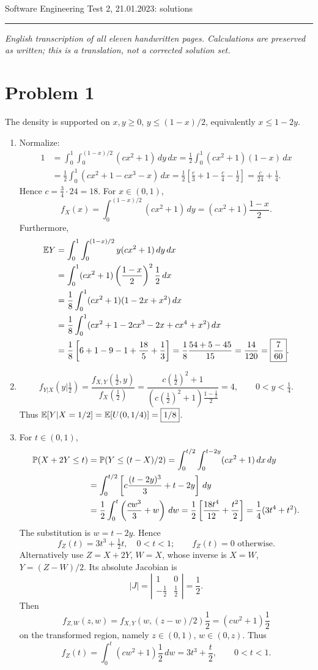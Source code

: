 \documentclass[a4paper]{article}
\begin{document}
\noindent Software Engineering \hfill Test 2, 21.01.2023: solutions
\par\smallskip\hrule\smallskip\noindent
\textit{English transcription of all eleven handwritten pages. Calculations are preserved as written; this is a translation, not a corrected solution set.}

\section*{Problem 1}
The density is supported on $x,y\geq0$, $y\leq(1-x)/2$, equivalently $x\leq1-2y$.
\begin{enumerate}
\item Normalize:
\begin{align*}
1&=\int_0^1\int_0^{(1-x)/2}(cx^2+1)\,dy\,dx
=\frac12\int_0^1(cx^2+1)(1-x)\,dx\\
&=\frac12\int_0^1(cx^2+1-cx^3-x)\,dx
=\frac12\left[\frac c3+1-\frac c4-\frac12\right]
=\frac c{24}+\frac14.
\end{align*}
Hence $\boxed{c=\frac34\cdot24=18}$.
For $x\in(0,1)$,
\[
\boxed{f_X(x)=\int_0^{(1-x)/2}(cx^2+1)\,dy
=(cx^2+1)\frac{1-x}{2}.}
\]
Furthermore,
\begin{align*}
\E Y&=\int_0^1\int_0^{(1-x)/2}y(cx^2+1)\,dy\,dx\\
&=\int_0^1(cx^2+1)\left(\frac{1-x}{2}\right)^2\frac12\,dx\\
&=\frac18\int_0^1(cx^2+1)(1-2x+x^2)\,dx\\
&=\frac18\int_0^1(cx^2+1-2cx^3-2x+cx^4+x^2)\,dx\\
&=\frac18\left[6+1-9-1+\frac{18}{5}+\frac13\right]
=\frac18\frac{54+5-45}{15}=\frac{14}{120}=\boxed{\frac7{60}}.
\end{align*}
\item
\[
f_{Y|X}(y|\tfrac12)=
\frac{f_{X,Y}(\frac12,y)}{f_X(\frac12)}
=\frac{c(\frac12)^2+1}{(c(\frac12)^2+1)\frac{1-\frac12}{2}}
=4,\qquad 0<y<\tfrac14.
\]
Thus $\E[Y|X=1/2]=\E[U(0,1/4)]=\boxed{1/8}$.
\item For $t\in(0,1)$,
\begin{align*}
\P(X+2Y\leq t)&=\P(Y\leq(t-X)/2)
=\int_0^{t/2}\int_0^{t-2y}(cx^2+1)\,dx\,dy\\
&=\int_0^{t/2}\left[c\frac{(t-2y)^3}{3}+t-2y\right]\,dy\\
&=\frac12\int_0^t\left(\frac{cw^3}{3}+w\right)\,dw
=\frac12\left[\frac{18t^4}{12}+\frac{t^2}{2}\right]
=\frac14(3t^4+t^2).
\end{align*}
The substitution is $w=t-2y$. Hence
\[
\boxed{f_Z(t)=3t^3+\tfrac12t,\quad0<t<1;\qquad f_Z(t)=0\text{ otherwise}.}
\]
Alternatively use $Z=X+2Y$, $W=X$, whose inverse is $X=W$, $Y=(Z-W)/2$. Its absolute Jacobian is
\[
|J|=\left|\begin{matrix}1&0\\-\frac12&\frac12\end{matrix}\right|=\frac12.
\]
Then
\[
f_{Z,W}(z,w)=f_{X,Y}(w,(z-w)/2)\frac12=(cw^2+1)\frac12
\]
on the transformed region, namely $z\in(0,1)$, $w\in(0,z)$. Thus
\[
f_Z(t)=\int_0^t(cw^2+1)\frac12\,dw=3t^3+\frac t2,\qquad0<t<1.
\]
\end{enumerate}
\end{document}
